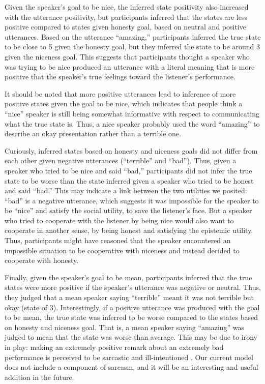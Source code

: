 \documentclass[10pt,letterpaper]{article}
\begin{document}
Given the speaker's goal to be nice, the inferred state positivity also increased with the utterance positivity, but participants inferred that the states are less positive compared to states given honesty goal, based on neutral and positive utterances. Based on the utterance ``amazing,'' participants inferred the true state to be close to 5 given the honesty goal, but they inferred the state to be around 3 given the niceness goal. This suggests that participants thought a speaker who was trying to be nice produced an utterance  with a literal meaning that is more positive that the speaker's true feelings toward the listener's performance.

It should be noted that more positive utterances lead to inference of more positive states given the goal to be nice, which indicates that people think a ``nice'' speaker is still being somewhat informative with respect to communicating what the true state is. Thus, a nice speaker probably used the word ``amazing'' to describe an okay presentation rather than a terrible one.

Curiously, inferred states based on honesty and niceness goals did not differ from each other given negative utterances (``terrible'' and ``bad''). Thus, given a speaker who tried to be nice and said ``bad,'' participants did not infer the true state to be worse than the state inferred given a speaker who tried to be honest and said ``bad.'' This may indicate a link between the two utilities we posited: ``bad'' is a negative utterance, which suggests it was impossible for the speaker to be ``nice'' and satisfy the social utility, to save the listener's face. But a speaker who tried to cooperate with the listener by being nice would also want to cooperate in another sense, by being honest and satisfying the epistemic utility.  Thus, participants might have reasoned that the speaker encountered an impossible situation to be cooperative with niceness and instead decided to cooperate with honesty. 

Finally, given the speaker's goal to be mean, participants inferred that the true states were more positive if the speaker's utterance was negative or neutral. Thus, they judged that a mean speaker saying ``terrible'' meant it was not terrible but okay (state of 3). Interestingly, if a positive utterance was produced with the goal to be mean, the true state was inferred to be worse compared to the states based on honesty and niceness goal. That is, a mean speaker saying ``amazing'' was judged to mean that the state was worse than average. This may be due to irony in play: making an extremely positive remark about an extremely bad performance is perceived to be sarcastic and ill-intentioned \cite{colston1997}. Our current model does not include a component of sarcasm, and it will be an interesting and useful addition in the future.
\end{document}
